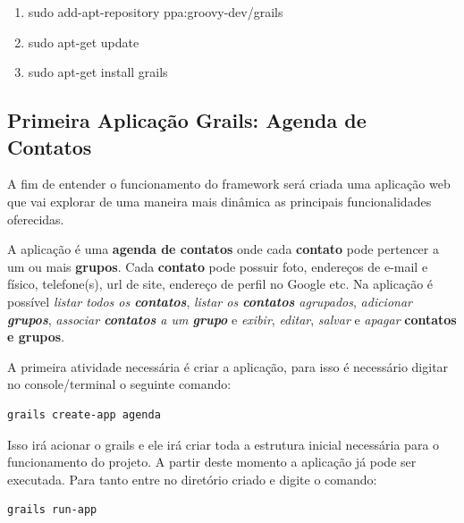 \documentclass[12pt]{article}
\begin{document}
    \begin{enumerate}
        \item sudo add-apt-repository ppa:groovy-dev/grails
        \item sudo apt-get update
        \item sudo apt-get install grails
    \end{enumerate}

\subsection{Primeira Aplicação Grails: Agenda de Contatos}

    A fim de entender o funcionamento do framework será criada uma aplicação web
    que vai explorar de uma maneira mais dinâmica as principais funcionalidades
    oferecidas.

    A aplicação é uma \textbf{agenda de contatos} onde cada \textbf{contato} pode 
    pertencer a um ou mais \textbf{grupos}. Cada \textbf{contato} pode possuir foto,
    endereços de e-mail e físico, telefone(s), url de site, endereço de perfil no 
    Google etc. Na aplicação é possível \emph{listar todos os \textbf{contatos}}, 
    \emph{listar os \textbf{contatos} agrupados}, \emph{adicionar \textbf{grupos}}, 
    \emph{associar \textbf{contatos} a um \textbf{grupo}} e \emph{exibir}, 
    \emph{editar}, \emph{salvar} e \emph{apagar} \textbf{contatos e grupos}.
    
    A primeira atividade necessária é criar a aplicação, para isso é necessário
    digitar no console/terminal o seguinte comando:
    
    \begin{lstlisting}[basicstyle={\small \ttfamily}]
        grails create-app agenda
    \end{lstlisting}
    
    Isso irá acionar o grails e ele irá criar toda a estrutura inicial necessária para
    o funcionamento do projeto. A partir deste momento a aplicação já pode ser 
    executada. Para tanto entre no diretório criado e digite o comando:
    
    \begin{lstlisting}[basicstyle={\small \ttfamily}]
        grails run-app
    \end{lstlisting}
    
\end{document}
